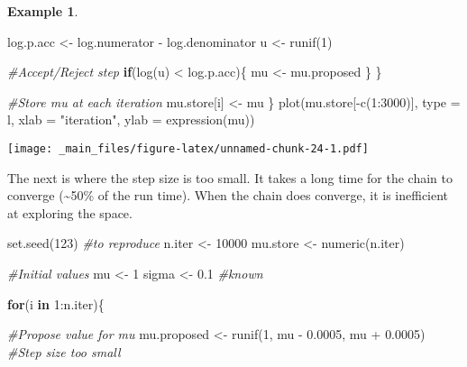 \documentclass[
]{book}
\newenvironment{Shaded}{\begin{snugshade}}{\end{snugshade}}
\newcommand{\AttributeTok}[1]{\textcolor[rgb]{0.77,0.63,0.00}{#1}}
\newcommand{\CommentTok}[1]{\textcolor[rgb]{0.56,0.35,0.01}{\textit{#1}}}
\newcommand{\ControlFlowTok}[1]{\textcolor[rgb]{0.13,0.29,0.53}{\textbf{#1}}}
\newcommand{\DecValTok}[1]{\textcolor[rgb]{0.00,0.00,0.81}{#1}}
\newcommand{\FloatTok}[1]{\textcolor[rgb]{0.00,0.00,0.81}{#1}}
\newcommand{\FunctionTok}[1]{\textcolor[rgb]{0.00,0.00,0.00}{#1}}
\newcommand{\NormalTok}[1]{#1}
\newcommand{\OtherTok}[1]{\textcolor[rgb]{0.56,0.35,0.01}{#1}}
\newcommand{\SpecialCharTok}[1]{\textcolor[rgb]{0.00,0.00,0.00}{#1}}
\newcommand{\StringTok}[1]{\textcolor[rgb]{0.31,0.60,0.02}{#1}}
\theoremstyle{definition}
\theoremstyle{definition}
\newtheorem{example}{Example}[chapter]
\theoremstyle{definition}
\theoremstyle{definition}
\theoremstyle{remark}
\begin{document}
\begin{example}
\begin{Shaded}
\begin{Highlighting}[]
\NormalTok{    log.p.acc }\OtherTok{\textless{}{-}}\NormalTok{ log.numerator }\SpecialCharTok{{-}}\NormalTok{ log.denominator}
\NormalTok{    u }\OtherTok{\textless{}{-}} \FunctionTok{runif}\NormalTok{(}\DecValTok{1}\NormalTok{)}
    
    \CommentTok{\#Accept/Reject step}
    \ControlFlowTok{if}\NormalTok{(}\FunctionTok{log}\NormalTok{(u) }\SpecialCharTok{\textless{}}\NormalTok{ log.p.acc)\{}
\NormalTok{      mu }\OtherTok{\textless{}{-}}\NormalTok{ mu.proposed}
\NormalTok{    \}}
\NormalTok{  \}}
  
  \CommentTok{\#Store mu at each iteration}
\NormalTok{  mu.store[i] }\OtherTok{\textless{}{-}}\NormalTok{ mu}
\NormalTok{\}}
\FunctionTok{plot}\NormalTok{(mu.store[}\SpecialCharTok{{-}}\FunctionTok{c}\NormalTok{(}\DecValTok{1}\SpecialCharTok{:}\DecValTok{3000}\NormalTok{)], }\AttributeTok{type =} \StringTok{\textquotesingle{}l\textquotesingle{}}\NormalTok{, }\AttributeTok{xlab =} \StringTok{"iteration"}\NormalTok{, }\AttributeTok{ylab =} \FunctionTok{expression}\NormalTok{(mu))}
\end{Highlighting}
\end{Shaded}

\texttt{[image: \_main\_files/figure-latex/unnamed-chunk-24-1.pdf]}

The next is where the step size is too small. It takes a long time for the chain to converge (\textasciitilde50\% of the run time). When the chain does converge, it is inefficient at exploring the space.

\begin{Shaded}
\begin{Highlighting}[]
\FunctionTok{set.seed}\NormalTok{(}\DecValTok{123}\NormalTok{) }\CommentTok{\#to reproduce}
\NormalTok{n.iter   }\OtherTok{\textless{}{-}} \DecValTok{10000}
\NormalTok{mu.store }\OtherTok{\textless{}{-}} \FunctionTok{numeric}\NormalTok{(n.iter)}

\CommentTok{\#Initial values}
\NormalTok{mu }\OtherTok{\textless{}{-}} \DecValTok{1} 
\NormalTok{sigma }\OtherTok{\textless{}{-}} \FloatTok{0.1} \CommentTok{\#known}

\ControlFlowTok{for}\NormalTok{(i }\ControlFlowTok{in} \DecValTok{1}\SpecialCharTok{:}\NormalTok{n.iter)\{}
  
  \CommentTok{\#Propose value for mu}
\NormalTok{  mu.proposed }\OtherTok{\textless{}{-}} \FunctionTok{runif}\NormalTok{(}\DecValTok{1}\NormalTok{, mu }\SpecialCharTok{{-}} \FloatTok{0.0005}\NormalTok{, mu }\SpecialCharTok{+} \FloatTok{0.0005}\NormalTok{) }\CommentTok{\#Step size too small}
  

\end{Highlighting}
\end{Shaded}
\end{example}
\end{document}
